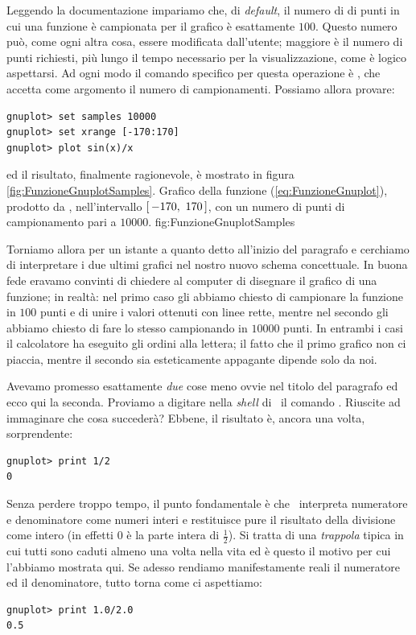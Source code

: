 Leggendo la documentazione impariamo che, di \emph{default}, il numero di
di punti in cui una funzione \`e campionata per il grafico \`e
esattamente $100$. Questo numero pu\`o, come ogni altra cosa, essere
modificata dall'utente; maggiore \`e il numero di punti richiesti, pi\`u lungo
il tempo necessario per la visualizzazione, come \`e logico aspettarsi.
Ad ogni modo il comando specifico per questa operazione \`e
, che accetta come argomento il numero di campionamenti.
Possiamo allora provare:
\begin{verbatim}
gnuplot> set samples 10000
gnuplot> set xrange [-170:170]
gnuplot> plot sin(x)/x
\end{verbatim}
ed il risultato, finalmente ragionevole, \`e mostrato in figura
\ref{fig:FunzioneGnuplotSamples}.
\panelfig
{}
{Grafico della funzione (\ref{eq:FunzioneGnuplot}), prodotto
da \gnuplot, nell'intervallo $\left[ \, -170, ~ 170 \, \right]$, con un numero
di punti di campionamento pari a $10000$.}
{fig:FunzioneGnuplotSamples}

Torniamo allora per un istante a quanto detto all'inizio del paragrafo e
cerchiamo di interpretare i due ultimi grafici nel nostro nuovo schema
concettuale. In buona fede eravamo convinti di chiedere al computer di
disegnare il grafico di una funzione; in realt\`a: nel primo caso gli abbiamo
chiesto  di campionare la funzione in $100$ punti e di unire i valori ottenuti
con linee rette, mentre nel secondo gli abbiamo chiesto di fare lo stesso
campionando in $10000$ punti.
In entrambi i casi il calcolatore ha eseguito gli ordini alla lettera; il fatto
che il primo grafico non ci piaccia, mentre il secondo sia esteticamente
appagante dipende solo da noi.

Avevamo promesso esattamente \emph{due} cose meno ovvie nel titolo del
paragrafo ed ecco qui la seconda. Proviamo a digitare nella \emph{shell}
di \gnuplot\ il comando .
Riuscite ad immaginare che cosa succeder\`a? Ebbene, il risultato \`e,
ancora una volta, sorprendente:
\begin{verbatim}
gnuplot> print 1/2
0
\end{verbatim}
Senza perdere troppo tempo, il punto fondamentale \`e che \gnuplot\ interpreta
numeratore e denominatore come numeri interi e restituisce pure il risultato
della divisione come intero (in effetti $0$ \`e la parte intera di
$\frac{1}{2}$).
Si tratta di una \emph{trappola} tipica in cui tutti sono caduti almeno una
volta nella vita ed \`e questo il motivo per cui l'abbiamo mostrata qui.
Se adesso rendiamo manifestamente reali il numeratore ed il denominatore,
tutto torna come ci aspettiamo:
\begin{verbatim}
gnuplot> print 1.0/2.0
0.5
\end{verbatim} 


